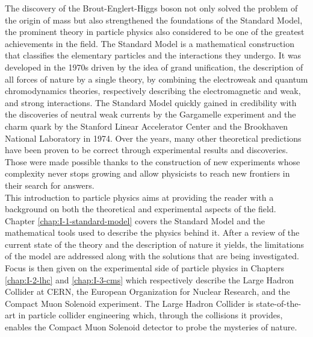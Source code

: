 The discovery of the Brout-Englert-Higgs boson not only solved the problem of the origin of mass but also strengthened the foundations of the Standard Model, the prominent theory in particle physics also considered to be one of the greatest achievements in the field. The Standard Model is a mathematical construction that classifies the elementary particles and the interactions they undergo. It was developed in the 1970s driven by the idea of grand unification, the description of all forces of nature by a single theory, by combining the electroweak and quantum chromodynamics theories, respectively describing the electromagnetic and weak, and strong interactions. The Standard Model quickly gained in credibility with the discoveries of neutral weak currents by the Gargamelle experiment and the charm quark by the Stanford Linear Accelerator Center and the Brookhaven National Laboratory in 1974. Over the years, many other theoretical predictions have been proven to be correct through experimental results and discoveries. Those were made possible thanks to the construction of new experiments whose complexity never stops growing and allow physicists to reach new frontiers in their search for answers. \\

This introduction to particle physics aims at providing the reader with a background on both the theoretical and experimental aspects of the field. Chapter \ref{chap:I-1-standard-model} covers the Standard Model and the mathematical tools used to describe the physics behind it. After a review of the current state of the theory and the description of nature it yields, the limitations of the model are addressed along with the solutions that are being investigated. Focus is then given on the experimental side of particle physics in Chapters \ref{chap:I-2-lhc} and \ref{chap:I-3-cms} which respectively describe the Large Hadron Collider at CERN, the European Organization for Nuclear Research, and the Compact Muon Solenoid experiment. The Large Hadron Collider is state-of-the-art in particle collider engineering which, through the collisions it provides, enables the Compact Muon Solenoid detector to probe the mysteries of nature.
